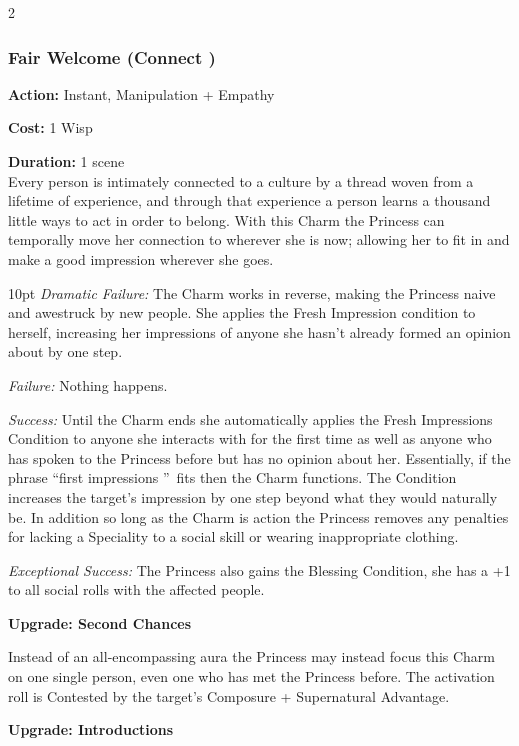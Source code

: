 \begin{multicols}{2}
\subsubsection*{Fair Welcome (Connect \textbullet)}

\noindent \textbf{Action:} Instant, Manipulation + Empathy
	
\noindent \textbf{Cost:} 1 Wisp

\noindent \textbf{Duration:} 1 scene \\

Every person is intimately connected to a culture by a thread woven from a lifetime of experience, and through that experience a person learns a thousand little ways to act in order to belong. With this Charm the Princess can temporally move her connection to wherever she is now; allowing her to fit in and make a good impression wherever she goes. 

\begin{myindentpar}{10pt} \emph{Dramatic Failure:} The Charm works in reverse, making the Princess naive and awestruck by new people. She applies the Fresh Impression condition to herself, increasing her impressions of anyone she hasn't already formed an opinion about by one step. 

    \emph{Failure:} Nothing happens. 

    \emph{Success:} Until the Charm ends she automatically applies the Fresh Impressions Condition to anyone she interacts with for the first time as well as anyone who has spoken to the Princess before but has no opinion about her. Essentially, if the phrase \textquotedblleft first impressions \textquotedblright\, fits then the Charm functions. The Condition increases the target's impression by one step beyond what they would naturally be. In addition so long as the Charm is action the Princess removes any penalties for lacking a Speciality to a social skill or wearing inappropriate clothing. 

    \emph{Exceptional Success:} The Princess also gains the Blessing Condition, she has a +1 to all social rolls with the affected people. 
    
    \textbf{Upgrade: Second Chances}

Instead of an all-encompassing aura the Princess may instead focus this Charm on one single person, even one who has met the Princess before. The activation roll is Contested by the target's Composure + Supernatural Advantage. 

    \textbf{Upgrade: Introductions}
    

\end{myindentpar}
\end{multicols}
